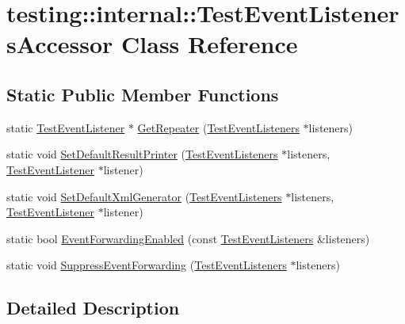 \hypertarget{classtesting_1_1internal_1_1_test_event_listeners_accessor}{}\section{testing\+:\+:internal\+:\+:Test\+Event\+Listeners\+Accessor Class Reference}
\label{classtesting_1_1internal_1_1_test_event_listeners_accessor}
\subsection*{Static Public Member Functions}
\begin{DoxyCompactItemize}
\item 
static \hyperlink{classtesting_1_1_test_event_listener}{Test\+Event\+Listener} $\ast$ \hyperlink{classtesting_1_1internal_1_1_test_event_listeners_accessor_a07c6f8644e509d0f23c0c16a60856387}{Get\+Repeater} (\hyperlink{classtesting_1_1_test_event_listeners}{Test\+Event\+Listeners} $\ast$listeners)
\item 
static void \hyperlink{classtesting_1_1internal_1_1_test_event_listeners_accessor_ac8886c7cea5a4ad39aed276d3f58da75}{Set\+Default\+Result\+Printer} (\hyperlink{classtesting_1_1_test_event_listeners}{Test\+Event\+Listeners} $\ast$listeners, \hyperlink{classtesting_1_1_test_event_listener}{Test\+Event\+Listener} $\ast$listener)
\item 
static void \hyperlink{classtesting_1_1internal_1_1_test_event_listeners_accessor_a8c04463b5ba5ee6d6da36e2171c7fff0}{Set\+Default\+Xml\+Generator} (\hyperlink{classtesting_1_1_test_event_listeners}{Test\+Event\+Listeners} $\ast$listeners, \hyperlink{classtesting_1_1_test_event_listener}{Test\+Event\+Listener} $\ast$listener)
\item 
static bool \hyperlink{classtesting_1_1internal_1_1_test_event_listeners_accessor_a4a7522557045cb55eb037dc61429d71c}{Event\+Forwarding\+Enabled} (const \hyperlink{classtesting_1_1_test_event_listeners}{Test\+Event\+Listeners} \&listeners)
\item 
static void \hyperlink{classtesting_1_1internal_1_1_test_event_listeners_accessor_abfc0a0f8163465f4f5d42436ec8c7cb3}{Suppress\+Event\+Forwarding} (\hyperlink{classtesting_1_1_test_event_listeners}{Test\+Event\+Listeners} $\ast$listeners)
\end{DoxyCompactItemize}


\subsection{Detailed Description}


